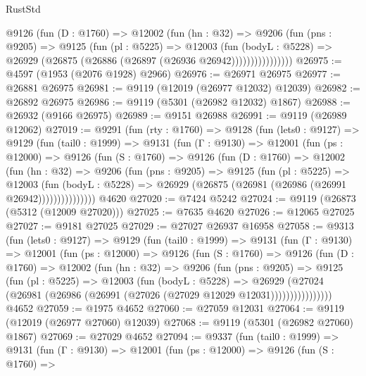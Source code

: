 \begin{lexlean}{RustStd}
\begin{coremodule}
                @9126
                  (fun (D : @1760) =>
                  @12002
                    (fun (hn : @32) =>
                    @9206
                      (fun (pns : @9205) =>
                      @9125
                        (fun (pl : @5225) =>
                        @12003
                          (fun (bodyL : @5228) =>
                          @26929 (@26875 (@26886 (@26897 (@26936 @26942))))))))))))))))
@26975 := @4597 (@1953 (@2076 @1928) @2966)
@26976 := @26971 @26975
@26977 := @26881 @26975
@26981 := @9119 (@12019 (@26977 @12032) @12039)
@26982 := @26892 @26975
@26986 := @9119 (@5301 (@26982 @12032) @1867)
@26988 := @26932 (@9166 @26975)
@26989 := @9151 @26988
@26991 := @9119 (@26989 @12062)
@27019 := @9291
    (fun (rty : @1760) =>
    @9128
      (fun (lets0 : @9127) =>
      @9129
        (fun (tail0 : @1999) =>
        @9131
          (fun (Γ : @9130) =>
          @12001
            (fun (ps : @12000) =>
            @9126
              (fun (S : @1760) =>
              @9126
                (fun (D : @1760) =>
                @12002
                  (fun (hn : @32) =>
                  @9206
                    (fun (pns : @9205) =>
                    @9125
                      (fun (pl : @5225) =>
                      @12003
                        (fun (bodyL : @5228) =>
                        @26929 (@26875 (@26981 (@26986 (@26991 @26942)))))))))))))))
    @4620
@27020 := @7424 @5242
@27024 := @9119 (@26873 (@5312 (@12009 @27020)))
@27025 := @7635 @4620
@27026 := @12065 @27025
@27027 := @9181 @27025
@27029 := @27027 @26937 @16958
@27058 := @9313
    (fun (lets0 : @9127) =>
    @9129
      (fun (tail0 : @1999) =>
      @9131
        (fun (Γ : @9130) =>
        @12001
          (fun (ps : @12000) =>
          @9126
            (fun (S : @1760) =>
            @9126
              (fun (D : @1760) =>
              @12002
                (fun (hn : @32) =>
                @9206
                  (fun (pns : @9205) =>
                  @9125
                    (fun (pl : @5225) =>
                    @12003
                      (fun (bodyL : @5228) =>
                      @26929
                        (@27024
                          (@26981 (@26986 (@26991 (@27026 (@27029 @12029 @12031))))))))))))))))
    @4652
@27059 := @1975 @4652
@27060 := @27059 @12031
@27064 := @9119 (@12019 (@26977 @27060) @12039)
@27068 := @9119 (@5301 (@26982 @27060) @1867)
@27069 := @27029 @4652
@27094 := @9337
    (fun (tail0 : @1999) =>
    @9131
      (fun (Γ : @9130) =>
      @12001
        (fun (ps : @12000) =>
        @9126
          (fun (S : @1760) =>

\end{coremodule}
\end{lexlean}
